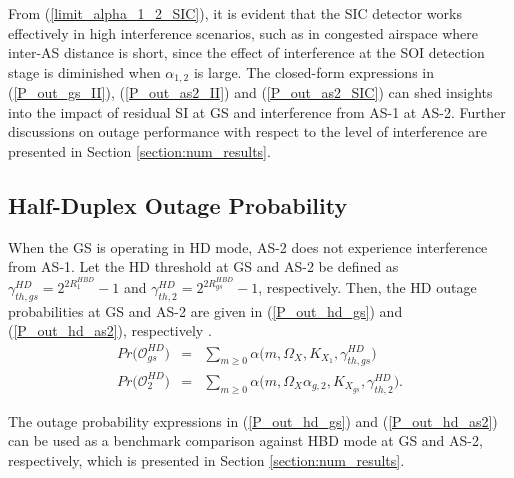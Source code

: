 From (\ref{limit_alpha_1_2_SIC}), it is evident that the SIC detector works effectively in high interference scenarios, such as in congested airspace where inter-AS distance is short, since the effect of interference at the SOI detection stage is diminished when $\alpha_{1,2}$ is large. The closed-form expressions in (\ref{P_out_gs_II}), (\ref{P_out_as2_II}) and (\ref{P_out_as2_SIC}) can shed insights into the impact of residual SI at GS and interference from AS-1 at AS-2. Further discussions on outage performance with respect to the level of interference are presented in Section \ref{section:num_results}. 

\subsection{Half-Duplex Outage Probability}
When the GS is operating in HD mode, AS-2 does not experience interference from AS-1. Let the HD threshold at GS and AS-2 be defined as $\gamma_{th,gs}^{HD} = 2^{2R_{1}^{HBD}}-1$ and $\gamma_{th,2}^{HD} = 2^{2R_{gs}^{HBD}}-1$, respectively. Then, the HD outage probabilities at GS and AS-2 are given in (\ref{P_out_hd_gs}) and (\ref{P_out_hd_as2}), respectively \cite[Table I]{rached2017unified}.
\begin{eqnarray} 
Pr\big(\mathcal{O}_{gs}^{HD}\big) & = & \sum_{m\geq0} \alpha\big(m,\Omega_X,K_{X_1},\gamma_{th,gs}^{HD}\big) \label{P_out_hd_gs} \\
Pr\big(\mathcal{O}_{2}^{HD}\big) & = & \sum_{m\geq0} \alpha\big(m,\Omega_X\alpha_{g,2},K_{X_{gs}},\gamma_{th,2}^{HD}\big). \label{P_out_hd_as2}
\end{eqnarray}

The outage probability expressions in (\ref{P_out_hd_gs}) and (\ref{P_out_hd_as2}) can be used as a benchmark comparison against HBD mode at GS and AS-2, respectively, which is presented in Section \ref{section:num_results}. 

